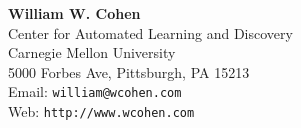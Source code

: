 

\setlength{\textheight}{9.25in}
\setlength{\textwidth}{7in}
\setlength{\oddsidemargin}{-0.5in}
\setlength{\evensidemargin}{-0.5in}
\setlength{\topmargin}{-0.5in}
\renewcommand{\topfraction}{0.99}
\renewcommand{\bottomfraction}{0.99}
\renewcommand{\textfraction}{0.01}

\newcommand{\prt}[1]{\vspace{\baselineskip}

{\noindent \bf #1:}}
\newcommand{\prti}[2]{\vspace{\baselineskip}

\noindent {\bf #1.} #2}
\newcommand{\bi}{\begin{itemize}}
\newcommand{\ei}{\end{itemize}}
\newcommand{\bd}{\begin{description}}
\newcommand{\ed}{\end{description}}



\begin{center}
{\bf William W. Cohen}\\
Center for Automated Learning and Discovery\\
Carnegie Mellon University\\
5000 Forbes Ave, Pittsburgh, PA 15213 \\
Email: {\tt william@wcohen.com}\\
Web: {\tt http://www.wcohen.com}\\
\end{center}

